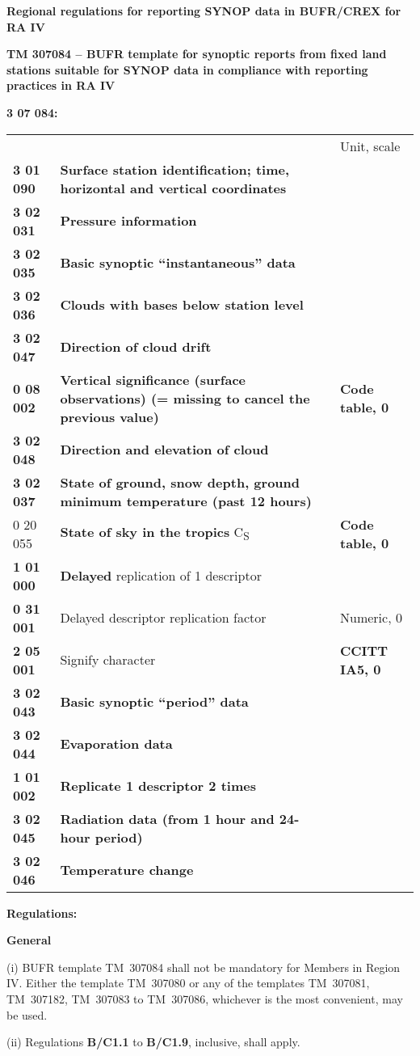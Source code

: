 \textbf{Regional regulations for reporting SYNOP data in BUFR/CREX for RA IV}

\textbf{TM 307084 -- BUFR template for synoptic reports from fixed land stations suitable for SYNOP data in compliance with reporting practices in RA IV}

\textbf{3 07 084:}

\begin{longtable}[]{@{}lll@{}}
\toprule
\endhead
& & Unit, scale\tabularnewline
\textbf{3 01 090} & \textbf{Surface station identification; time, horizontal and vertical coordinates} &\tabularnewline
\textbf{3 02 031} & \textbf{Pressure information} &\tabularnewline
\textbf{3 02 035} & \textbf{Basic synoptic ``instantaneous'' data} &\tabularnewline
\textbf{3 02 036} & \textbf{Clouds with bases below station level} &\tabularnewline
\textbf{3 02 047} & \textbf{Direction of cloud drift} &\tabularnewline
\textbf{0 08 002} & \textbf{Vertical significance (surface observations) (= missing to cancel the previous value)} & \textbf{Code table, 0}\tabularnewline
\textbf{3 02 048} & \textbf{Direction and elevation of cloud} &\tabularnewline
\textbf{3 02 037} & \textbf{State of ground, snow depth, ground minimum temperature (past 12 hours)} &\tabularnewline
0 20 055 & \textbf{State of sky in the tropics} C\textsubscript{S} & \textbf{Code table, 0}\tabularnewline
\textbf{1 01 000} & \textbf{Delayed} replication of 1 descriptor &\tabularnewline
\textbf{0 31 001} & Delayed descriptor replication factor & Numeric, 0\tabularnewline
\textbf{2 05 001} & Signify character & \textbf{CCITT IA5, 0}\tabularnewline
\textbf{3 02 043} & \textbf{Basic synoptic ``period'' data} &\tabularnewline
\textbf{3 02 044} & \textbf{Evaporation data} &\tabularnewline
\textbf{1 01 002} & \textbf{Replicate 1 descriptor 2 times} &\tabularnewline
\textbf{3 02 045} & \textbf{Radiation data (from 1 hour and 24-hour period)} &\tabularnewline
\textbf{3 02 046} & \textbf{Temperature change} &\tabularnewline
\bottomrule
\end{longtable}

\textbf{Regulations:}

\textbf{General}

(i) BUFR template TM~307084 shall not be mandatory for Members in Region IV. Either the template TM~307080 or any of the templates TM~307081, TM~307182, TM~307083 to TM~307086, whichever is the most convenient, may be used.

(ii) Regulations \textbf{B/C1.1} to \textbf{B/C1.9}, inclusive, shall apply.

